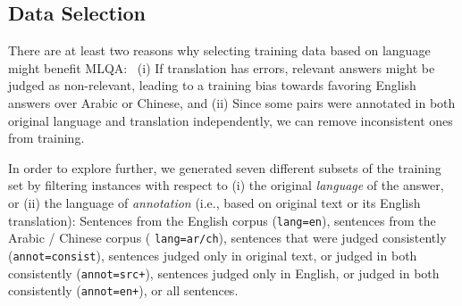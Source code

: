 \documentclass{sig-alternate-05-2015}
\begin{document}
\subsection{Data Selection} \label{sec:data}
There are at least two reasons why selecting training data based on language might benefit MLQA:\
(i) If translation has errors, relevant answers might 
be judged as non-relevant, leading to a training bias towards favoring 
English answers over Arabic or Chinese, and (ii)
Since some pairs were annotated in both original language and translation independently, we can remove 
inconsistent ones from training.

In order to explore further, we generated seven different subsets of the training set by filtering instances with respect to (i) the 
original \emph{language} of the answer, or (ii) the language of \emph{annotation} (i.e., based on original text or its
English translation): Sentences from the English corpus ({\tt lang=en}), sentences from the Arabic / Chinese corpus (
{\tt lang=ar/ch}), sentences that were judged consistently ({\tt annot=consist}), sentences judged only in original text, 
or judged in both consistently ({\tt annot=src+}), sentences judged only in English, or judged in both consistently ({\tt  annot=en+}),
or all sentences.
\vspace{-0.35cm}

\end{document}
